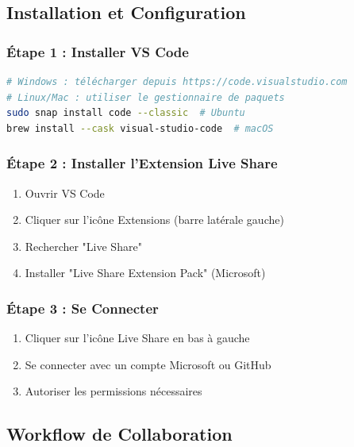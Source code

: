 \documentclass[11pt,a4paper]{article}
\begin{document}
\subsection{Installation et Configuration}

\subsubsection{Étape 1 : Installer VS Code}
\begin{lstlisting}[language=bash]
# Windows : télécharger depuis https://code.visualstudio.com
# Linux/Mac : utiliser le gestionnaire de paquets
sudo snap install code --classic  # Ubuntu
brew install --cask visual-studio-code  # macOS
\end{lstlisting}

\subsubsection{Étape 2 : Installer l'Extension Live Share}
\begin{enumerate}
    \item Ouvrir VS Code
    \item Cliquer sur l'icône Extensions (barre latérale gauche)
    \item Rechercher "Live Share"
    \item Installer "Live Share Extension Pack" (Microsoft)
\end{enumerate}

\subsubsection{Étape 3 : Se Connecter}
\begin{enumerate}
    \item Cliquer sur l'icône Live Share en bas à gauche
    \item Se connecter avec un compte Microsoft ou GitHub
    \item Autoriser les permissions nécessaires
\end{enumerate}

\subsection{Workflow de Collaboration}
\end{document}
